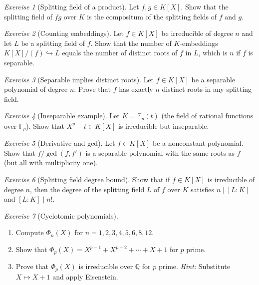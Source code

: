 \documentclass[12pt,a4paper,openany]{book}
\theoremstyle{definition}
\theoremstyle{remark}
\newtheorem{exercise}{Exercise}[chapter]
\newcommand{\Q}{\mathbb{Q}}
\newcommand{\F}{\mathbb{F}}
\begin{document}
\begin{exercise}[Splitting field of a product]
\label{exer:split-product}
Let $f, g \in K[X]$. Show that the splitting field of $fg$ over $K$
is the compositum of the splitting fields of $f$ and $g$.
\end{exercise}

\begin{exercise}[Counting embeddings]
\label{exer:counting-embeddings}
Let $f \in K[X]$ be irreducible of degree $n$ and let $L$ be a
splitting field of $f$. Show that the number of $K$-embeddings
$K[X]/(f) \hookrightarrow L$ equals the number of distinct roots of
$f$ in $L$, which is $n$ if $f$ is separable.
\end{exercise}

\begin{exercise}[Separable implies distinct roots]
\label{exer:separable-distinct}
Let $f \in K[X]$ be a separable polynomial of degree $n$. Prove that
$f$ has exactly $n$ distinct roots in any splitting field.
\end{exercise}

\begin{exercise}[Inseparable example]
\label{exer:inseparable-example}
Let $K = \F_p(t)$ (the field of rational functions over $\F_p$).
Show that $X^p - t \in K[X]$ is irreducible but inseparable.
\end{exercise}

\begin{exercise}[Derivative and gcd]
\label{exer:derivative-gcd}
Let $f \in K[X]$ be a nonconstant polynomial. Show that
$f / \gcd(f, f')$ is a separable polynomial with the same roots as
$f$ (but all with multiplicity one).
\end{exercise}

\begin{exercise}[Splitting field degree bound]
\label{exer:split-degree-bound}
Show that if $f \in K[X]$ is irreducible of degree $n$, then the
degree of the splitting field $L$ of $f$ over $K$ satisfies
$n \mid [L:K]$ and $[L:K] \mid n!$.
\end{exercise}

\begin{exercise}[Cyclotomic polynomials]
\label{exer:cyclotomic}
\begin{enumerate}[label=(\alph*)]
  \item Compute $\Phi_n(X)$ for $n = 1, 2, 3, 4, 5, 6, 8, 12$.
  \item Show that $\Phi_p(X) = X^{p-1} + X^{p-2} + \cdots + X + 1$
    for $p$ prime.
  \item Prove that $\Phi_p(X)$ is irreducible over $\Q$ for $p$ prime.
    \textit{Hint:} Substitute $X \mapsto X+1$ and apply Eisenstein.
\end{enumerate}
\end{exercise}
\end{document}
